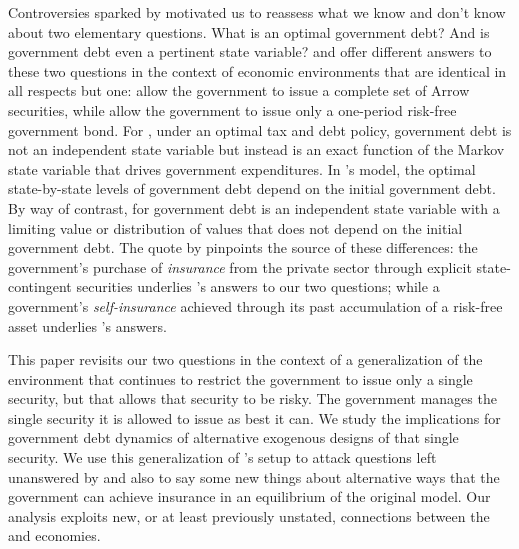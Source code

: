 \documentclass[12pt]{article}
\begin{document}
Controversies sparked by  \citet{Reinhart2010} motivated us to reassess what we know and don't know about two elementary questions.
What is an optimal  government debt? And  is government debt  even a pertinent state variable? %
\citet{LucasJr.1983} and \citet{Aiyagari2002} offer  different answers to these two
questions in the context of  economic environments that are identical in all respects but one: \citet{LucasJr.1983} allow the government to issue
a complete set of Arrow securities, while   \citet{Aiyagari2002} allow the government to issue only a one-period risk-free government bond.  For
\citeauthor{LucasJr.1983}, under an optimal tax and debt policy,  government debt is not an independent state variable but instead is an exact function of
 the Markov state variable that  drives government expenditures.  In \citeauthor{LucasJr.1983}'s model, the optimal state-by-state levels 
 of government debt  depend on the initial
 government debt.  By way of contrast, for \citet{Aiyagari2002} government debt is an independent state variable with a limiting value or distribution
 of values that does not depend on the initial government debt.  The quote by \citeauthor{LucasJr.1983} pinpoints the source of these differences:
 the government's purchase of {\em insurance} from the private sector  through explicit state-contingent securities underlies \citeauthor{LucasJr.1983}'s
 answers to our two questions; while a government's {\em self-insurance} achieved through its past accumulation of
 a risk-free asset underlies \citeauthor{Aiyagari2002}'s answers.

This paper revisits  our two questions in the context of a generalization of the \citet{Aiyagari2002} environment that continues to restrict
the government to issue only a single security, but that allows that security to be risky.  The  government
manages the single security it is allowed to issue as best it can.  We study the implications for government debt dynamics of alternative exogenous
designs of that single security.  We use this generalization of \citeauthor{Aiyagari2002}'s setup to attack questions left unanswered by \citeauthor{Aiyagari2002}
and also to say some new things about alternative ways that  the government can achieve  insurance in an equilibrium of the original    \citet{LucasJr.1983}
model. Our analysis exploits  new, or at least previously unstated, connections between the \citeauthor{LucasJr.1983} and \citeauthor{Aiyagari2002} economies.
\end{document}
